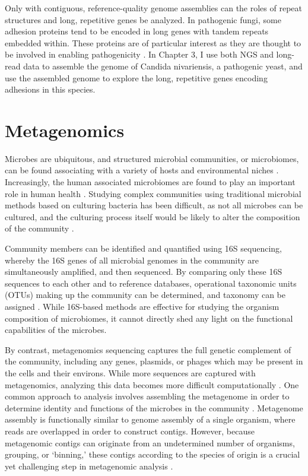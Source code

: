 Only with contiguous, reference-quality genome assemblies can the roles of repeat structures and long, repetitive genes be analyzed. In pathogenic fungi, some adhesion proteins tend to be encoded in long genes with tandem repeats embedded within. These proteins are of particular interest as they are thought to be involved in enabling pathogenicity \citep{Timmermans2018-ci}. In Chapter 3, I use both NGS and long-read data to assemble the genome of Candida nivariensis, a pathogenic yeast, and use the assembled genome to explore the long, repetitive genes encoding adhesions in this species.

\section{Metagenomics}
\label{sec:asm}
Microbes are ubiquitous, and structured microbial communities, or microbiomes, can be found associating with a variety of hosts and environmental niches \citep{Quince2017-ay}. Increasingly, the human associated microbiomes are found to play an important role in human health \citep{Fan2021-hh}. Studying complex communities using traditional microbial methods based on culturing bacteria has been difficult, as not all microbes can be cultured, and the culturing process itself would be likely to alter the composition of the community \citep{Quince2017-ay}.

Community members can be identified and quantified using 16S sequencing, whereby the 16S genes of all microbial genomes in the community are simultaneously amplified, and then sequenced. By comparing only these 16S sequences to each other and to reference databases, operational taxonomic units (OTUs) making up the community can be determined, and taxonomy can be assigned \citep{Johnson2019-wk}. While 16S-based methods are effective for studying the organism composition of microbiomes, it cannot directly shed any light on the functional capabilities of the microbes.

By contrast, metagenomics sequencing captures the full genetic complement of the community, including any genes, plasmids, or phages which may be present in the cells and their environs. While more sequences are captured with metagenomics, analyzing this data becomes more difficult computationally \citep{Breitwieser2019-zp}. One common approach to analysis involves assembling the metagenome in order to determine identity and functions of the microbes in the community \citep{Lapidus2021-dj}. Metagenome assembly is functionally similar to genome assembly of a single organism, where reads are overlapped in order to construct contigs. However, because metagenomic contigs can originate from an undetermined number of organisms, grouping, or ‘binning,’ these contigs according to the species of origin is a crucial yet challenging step in metagenomic analysis \citep{Yue2020-cm}.

